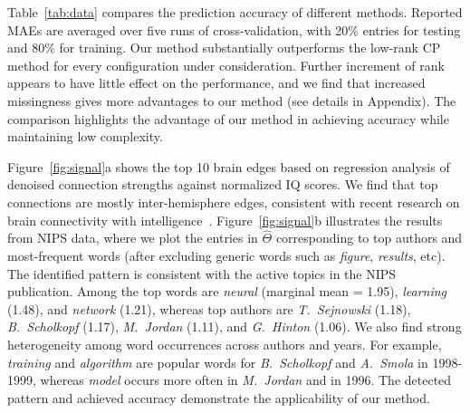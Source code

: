 \documentclass{article}
\theoremstyle{plain}
\theoremstyle{definition}
\begin{document}
\vspace{-.3cm}

Table~\ref{tab:data} compares the prediction accuracy of different methods. Reported MAEs are averaged over five runs of cross-validation, with 20\% entries for testing and 80\% for training. Our method substantially outperforms the low-rank CP method for every configuration under consideration. Further increment of rank appears to have little effect on the performance, and we find that increased missingness gives more advantages to our method (see details in Appendix). The comparison highlights the advantage of our method in achieving accuracy while maintaining low complexity. 


Figure~\ref{fig:signal}a shows the top 10 brain edges based on regression analysis of denoised connection strengths against normalized IQ scores. We find that top connections are mostly inter-hemisphere edges, consistent with recent research on brain connectivity with intelligence~\cite{li2009brain,wang2017bayesian}. Figure~\ref{fig:signal}b illustrates the results from NIPS data, where we plot the entries in $\hat \Theta$ corresponding to top authors and most-frequent words (after excluding generic words such as \emph{figure}, \emph{results}, etc). The identified pattern is consistent with the active topics in the NIPS publication. Among the top words are \emph{neural} (marginal mean = 1.95), \emph{learning} (1.48), and \emph{network} (1.21), whereas top authors are \emph{T.\ Sejnowski} (1.18), \emph{B.~Scholkopf} (1.17), \emph{M.\ Jordan} (1.11), and \emph{G.\ Hinton} (1.06). We also find strong heterogeneity among word occurrences across authors and years. For example, \emph{training} and \emph{algorithm} are popular words for \emph{B.\ Scholkopf} and \emph{A.\ Smola} in 1998-1999, whereas \emph{model} occurs more often in \emph{M.\ Jordan} and in 1996. The detected pattern and achieved accuracy demonstrate the applicability of our method.
\end{document}
